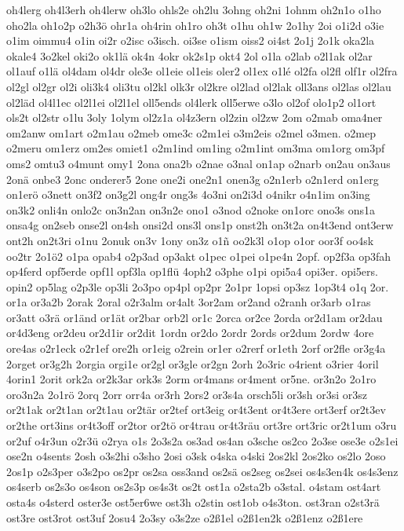 {oh4lerg
oh4l3erh
oh4lerw
oh3lo
ohls2e
oh2lu
3ohng
oh2ni
1ohnm
oh2n1o
o1ho
oho2la
oh1o2p
o2h3ö
ohr1a
oh4rin
oh1ro
oh3t
o1hu
oh1w
2o1hy
2oi
o1i2d
o3ie
o1im
oimmu4
o1in
oi2r
o2isc
o3isch.
oi3se
o1ism
oiss2
oi4st
2o1j
2o1k
oka2la
okale4
3o2kel
oki2o
ok1lä
ok4n
4okr
ok2s1p
okt4
2ol
o1la
o2lab
o2l1ak
ol2ar
ol1auf
o1lä
ol4dam
ol4dr
ole3e
ol1eie
ol1eis
oler2
ol1ex
o1lé
ol2fa
ol2fl
olf1r
ol2fra
ol2gl
ol2gr
ol2i
oli3k4
oli3tu
ol2kl
olk3r
ol2kre
ol2lad
ol2lak
oll3ans
ol2las
ol2lau
ol2läd
ol4l1ec
ol2l1ei
ol2l1el
oll5ends
ol4lerk
oll5erwe
o3lo
ol2of
olo1p2
ol1ort
ols2t
ol2str
o1lu
3oly
1olym
ol2z1a
ol4z3ern
ol2zin
ol2zw
2om
o2mab
oma4ner
om2anw
om1art
o2m1au
o2meb
ome3c
o2m1ei
o3m2eis
o2mel
o3men.
o2mep
o2meru
om1erz
om2es
omiet1
o2m1ind
om1ing
o2m1int
om3ma
om1org
om3pf
oms2
omtu3
o4munt
omy1
2ona
ona2b
o2nae
o3nal
on1ap
o2narb
on2au
on3aus
2onä
onbe3
2onc
onderer5
2one
one2i
one2n1
onen3g
o2n1erb
o2n1erd
on1erg
on1erö
o3nett
on3f2
on3g2l
ong4r
ong3s
4o3ni
on2i3d
o4nikr
o4n1im
on3ing
on3k2
onli4n
onlo2c
on3n2an
on3n2e
ono1
o3nod
o2noke
on1orc
ono3s
ons1a
onsa4g
on2seb
onse2l
on4sh
onsi2d
ons3l
ons1p
onst2h
on3t2a
on4t3end
ont3erw
ont2h
on2t3ri
o1nu
2onuk
on3v
1ony
on3z
o1ñ
oo2k3l
o1op
o1or
oor3f
oo4sk
oo2tr
2o1ö2
o1pa
opab4
o2p3ad
op3akt
o1pec
o1pei
o1pe4n
2opf.
op2f3a
op3fah
op4ferd
opf5erde
opf1l
opf3la
op1flü
4oph2
o3phe
o1pi
opi5a4
opi3er.
opi5ers.
opin2
op5lag
o2p3le
op3li
2o3po
op4pl
op2pr
2o1pr
1opsi
op3sz
1op3t4
o1q
2or.
or1a
or3a2b
2orak
2oral
o2r3alm
or4alt
3or2am
or2and
o2ranh
or3arb
o1ras
or3att
o3rä
or1änd
or1ät
or2bar
orb2l
or1c
2orca
or2ce
2orda
or2d1am
or2dau
or4d3eng
or2deu
or2d1ir
or2dit
1ordn
or2do
2ordr
2ords
or2dum
2ordw
4ore
ore4as
o2r1eck
o2r1ef
ore2h
or1eig
o2rein
or1er
o2rerf
or1eth
2orf
or2fle
or3g4a
2orget
or3g2h
2orgia
orgi1e
or2gl
or3gle
or2gn
2orh
2o3ric
o4rient
o3rier
4oril
4orin1
2orit
ork2a
or2k3ar
ork3s
2orm
or4mans
or4ment
or5ne.
or3n2o
2o1ro
oro3n2a
2o1rö
2orq
2orr
orr4a
or3rh
2ors2
or3s4a
orsch5li
or3sh
or3si
or3sz
or2t1ak
or2t1an
or2t1au
or2tär
or2tef
ort3eig
or4t3ent
or4t3ere
ort3erf
or2t3ev
or2the
ort3ins
or4t3off
or2tor
or2tö
or4trau
or4t3räu
ort3re
ort3ric
or2t1um
o3ru
or2uf
o4r3un
o2r3ü
o2rya
o1s
2o3s2a
os3ad
os4an
o3sche
os2co
2o3se
ose3e
o2s1ei
ose2n
o4sents
2osh
o3s2hi
o3sho
2osi
o3sk
o4ska
o4ski
2os2kl
2os2ko
os2lo
2oso
2os1p
o2s3per
o3s2po
os2pr
os2sa
oss3and
os2sä
os2seg
os2sei
os4s3en4k
os4s3enz
os4serb
os2s3o
os4son
os2s3p
os4s3t
os2t
ost1a
o2sta2b
o3stal.
o4stam
ost4art
osta4s
o4sterd
oster3e
ost5er6we
ost3h
o2stin
ost1ob
o4s3ton.
ost3ran
o2st3rä
ost3re
ost3rot
ost3uf
2osu4
2o3sy
o3s2ze
o2ß1el
o2ß1en2k
o2ß1enz
o2ß1ere
}
